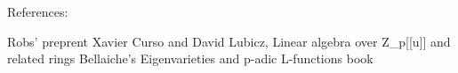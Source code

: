 References:

Robs' preprent
Xavier Curso and David Lubicz, Linear algebra over Z_p[[u]] and related rings
Bellaiche's  Eigenvarieties and p-adic L-functions book
